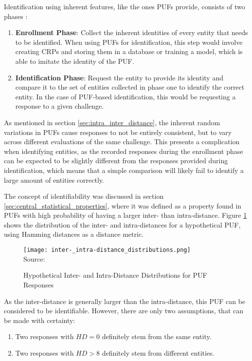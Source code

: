 Identification using inherent features, like the ones PUFs provide, consists of two phases \cite[][p. 119f]{Maes2013}:
\begin{enumerate}
    \item \textbf{Enrollment Phase}: Collect the inherent identities of every entity that needs to be identified.
          When using PUFs for identification, this step would involve creating \acp{CRP} and storing them in
          a database \cite{Devadas2008} or training a model, which is able to imitate the identity of the PUF.
          \cite{Majzoobi2012}
    \item \textbf{Identification Phase}: Request the entity to provide its identity and compare it to the
          set of entities collected in phase one to identify the correct entity.
          In the case of PUF-based identification, this would be requesting a response to a given challenge.
\end{enumerate}

As mentioned in section \ref{sec:intra_inter_distance}, the inherent random variations in PUFs cause responses to not
be entirely consistent, but to vary across different evaluations of the same challenge.
This presents a complication when identifying entities, as the recorded responses during the enrollment phase can be
expected to be slightly different from the responses provided during identification, which means that
a simple comparison will likely fail to identify a large amount of entities correctly. \cite[][p. 121f]{Maes2013}

The concept of identifiability was discussed in section \ref{sec:central_statistical_properties}, where it was defined
as a property found in PUFs with high probability of having a larger inter- than intra-distance.
Figure \ref{fig:inter_intra_distance_distributions} shows the distribution of the inter- and intra-distances
for a hypothetical PUF, using Hamming distances as a distance metric. \cite[][p. 121f]{Maes2013}

\begin{figure}[H]
    \centering
    \caption{Hypothetical Inter- and Intra-Distance Distributions for PUF Responses}
    \label{fig:inter_intra_distance_distributions}
    \texttt{[image: inter-\_intra-distance\_distributions.png]}
    \\
    Source: \cite[][p. 122]{Maes2013}
\end{figure}

As the inter-distance is generally larger than the intra-distance, this PUF can be considered to be identifiable.
However, there are only two assumptions, that can be made with certainty:
\begin{enumerate}
    \item Two responses with $HD = 0$ definitely stem from the same entity.
    \item Two responses with $HD > 8$ definitely stem from different entities.
\end{enumerate}

